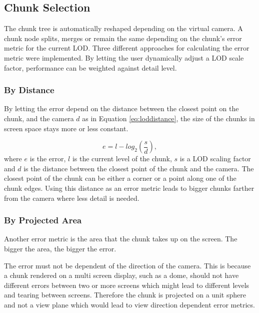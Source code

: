 \subsection{Chunk Selection}
\label{section:chunkselection}
The chunk tree is automatically reshaped depending on the virtual camera. A chunk node splits, merges or remain the same depending on the chunk's error metric for the current LOD. Three different approaches for calculating the error metric were implemented. By letting the user dynamically adjust a LOD scale factor, performance can be weighted against detail level.

\subsubsection{By Distance}
By letting the error depend on the distance between the closest point on the chunk, and the camera $d$ as in Equation \ref{eq:loddistance}, the size of the chunks in screen space stays more or less constant.

\begin{equation}
	\label{eq:loddistance}
	e = l - log_2(\frac{s}{d}),
\end{equation}
where $e$ is the error, $l$ is the current level of the chunk, $s$ is a LOD scaling factor and $d$ is the distance between the closest point of the chunk and the camera. The closest point of the chunk can be either a corner or a point along one of the chunk edges. Using this distance as an error metric leads to bigger chunks farther from the camera where less detail is needed.


\subsubsection{By Projected Area}
Another error metric is the area that the chunk takes up on the screen. The bigger the area, the bigger the error. 

The error must not be dependent of the direction of the camera. This is because a chunk rendered on a multi screen display, such as a dome, should not have different errors between two or more screens which might lead to different levels and tearing between screens. Therefore the chunk is projected on a unit sphere and not a view plane which would lead to view direction dependent error metrics.

